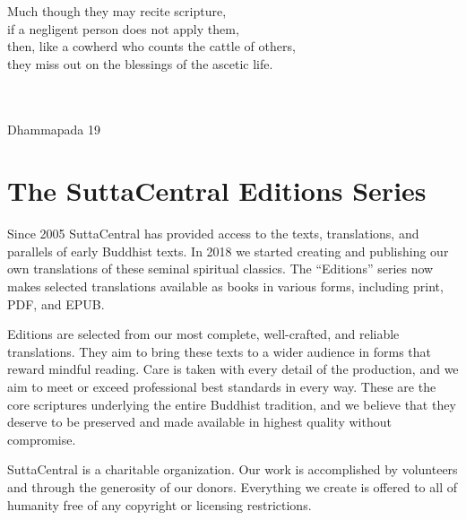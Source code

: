 \documentclass[12pt,openany]{book}%
\newcommand{\blankpage}{
\newpage
\thispagestyle{empty}
\mbox{}
\newpage
}
\newcommand*{\epigraphTranslatedTitle}[1]{\vspace*{.5em}\footnotesize\textsc{#1}\\}%
\newcommand*{\epigraphRootTitle}[1]{\footnotesize\textit{#1}\\}%
\newcommand*{\epigraphReference}[1]{\footnotesize{#1}}%
\begin{document}
\newpage

\setlength{\parindent}{1.5em}%
\newpage

\vspace*{\fill}

\begin{center}
\epigraph{Much though they may recite scripture,\\
if a negligent person does not apply them,\\
then, like a cowherd who counts the cattle of others,\\
they miss out on the blessings of the ascetic life.}
{
\epigraphTranslatedTitle{}
\epigraphRootTitle{}
\epigraphReference{Dhammapada 19}
}
\end{center}

\vspace*{2in}

\vspace*{\fill}

\blankpage%

\setlength{\parindent}{1em}
%
\tableofcontents
\newpage
\pagestyle{fancy}
%
\chapter*{The SuttaCentral Editions Series}

Since 2005 SuttaCentral has provided access to the texts, translations, and parallels of early Buddhist texts. In 2018 we started creating and publishing our own translations of these seminal spiritual classics. The “Editions” series now makes selected translations available as books in various forms, including print, PDF, and EPUB.

Editions are selected from our most complete, well-crafted, and reliable translations. They aim to bring these texts to a wider audience in forms that reward mindful reading. Care is taken with every detail of the production, and we aim to meet or exceed professional best standards in every way. These are the core scriptures underlying the entire Buddhist tradition, and we believe that they deserve to be preserved and made available in highest quality without compromise.

SuttaCentral is a charitable organization. Our work is accomplished by volunteers and through the generosity of our donors. Everything we create is offered to all of humanity free of any copyright or licensing restrictions. 
\end{document}
